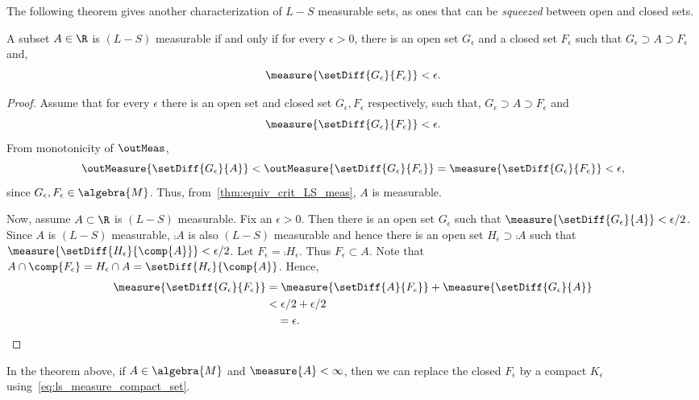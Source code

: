 The following theorem gives another characterization of $L-S$ measurable sets, as ones that can
be \emph{squeezed} between open and closed sets.
\begin{Theorem}[name=Squeezing a measurable set by open and closed set]\label{thm:LS_meas_squeezed_closed_open}
    A subset $A \in \R$ is $(L-S)$ measurable if and only if for every $\epsilon > 0$, there is an
    open set $G_{\epsilon}$ and a closed set $F_{\epsilon}$ such that $G_{\epsilon} \supset A
    \supset F_{\epsilon}$ and,
    \[\measure{\setDiff{G_{\epsilon}}{F_{\epsilon}}} < \epsilon.\]
\end{Theorem}
\begin{proof}
    Assume that for every $\epsilon$ there is an open set and closed set $G_{\epsilon},F_{\epsilon}$
    respectively, such that, $G_{\epsilon} \supset A
    \supset F_{\epsilon}$ and
    \[\measure{\setDiff{G_{\epsilon}}{F_{\epsilon}}} < \epsilon.\]
    From monotonicity of $\outMeas$,
    \[\outMeasure{\setDiff{G_{\epsilon}}{A}} < \outMeasure{\setDiff{G_{\epsilon}}{F_{\epsilon}}}
	= \measure{\setDiff{G_{\epsilon}}{F_{\epsilon}}} < \epsilon, \]
    since $G_{\epsilon},F_{\epsilon} \in \algebra{M}$. Thus, from~\ref{thm:equiv_crit_LS_meas}, $A$
    is measurable.

    Now, assume $A\subset\R$ is $(L-S)$ measurable. Fix an $\epsilon > 0$. Then there is an open set 
    $G_{\epsilon}$ such that $\measure{\setDiff{G_{\epsilon}}{A}} < \epsilon/2$. Since $A$ is
    $(L-S)$ measurable, $\comp{A}$ is also $(L-S)$ measurable and hence there is an open set
    $H_{\epsilon}\supset \comp{A}$ such that 
    $\measure{\setDiff{H_{\epsilon}}{\comp{A}}} < \epsilon/2$. Let $F_{\epsilon} =
    \comp{H_{\epsilon}}$. Thus $F_{\epsilon} \subset A$. 
    Note that $A\cap\comp{F_{\epsilon}} = H_{\epsilon}\cap A = \setDiff{H_{\epsilon}}{\comp{A}}$. 
    Hence,
    \begin{align*}
	\measure{\setDiff{G_{\epsilon}}{F_{\epsilon}}} &= \measure{\setDiff{A}{F_{\epsilon}}} +
	\measure{\setDiff{G_{\epsilon}}{A}}\\
	& < \epsilon/2 + \epsilon/2 \\
	&\quad = \epsilon.
    \end{align*}
\end{proof}
\begin{Remark}\label{rmk:ls_meas_compact_open}
    In the theorem above, if $A \in \algebra{M}$ and $\measure{A} < \infty$, then we can replace the
    closed $F_{\epsilon}$ by a compact $K_{\epsilon}$ using~\ref{eq:ls_measure_compact_set}.
\end{Remark}
